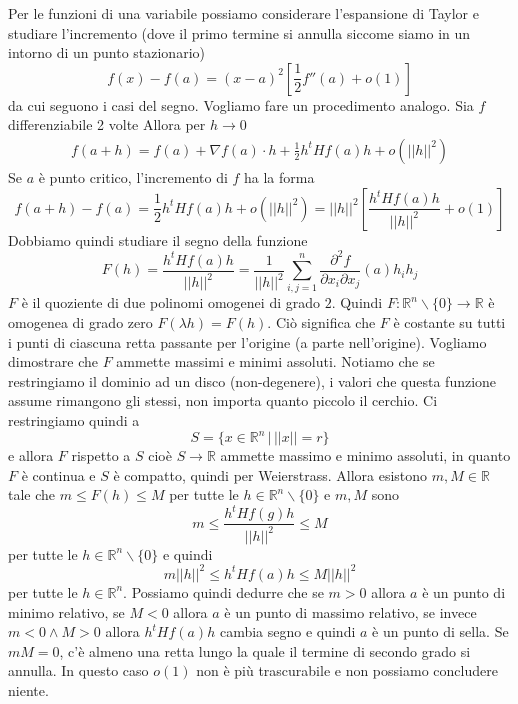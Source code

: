 \documentclass[a4paper]{article}
\begin{document}
Per le funzioni di una variabile possiamo considerare l'espansione di Taylor
e studiare l'incremento (dove il primo termine si annulla siccome siamo in un intorno di un punto stazionario)
\[
    f(x) - f(a) = {(x-a)}^2 \left[
        \frac{1}{2}f''(a) + o(1)
    \right]
\]
da cui seguono i casi del segno.
Vogliamo fare un procedimento analogo.
Sia \(f\) differenziabile 2 volte
Allora per \(h \to 0\)
\begin{align*}
    f(a + h) = f(a) + \nabla f(a) \cdot h + \frac{1}{2}h^t Hf(a)h + o(||h||^2)
\end{align*}
Se \(a\) è punto critico, l'incremento di \(f\) ha la forma
\[
    f(a + h) - f(a) = \frac{1}{2}h^t Hf(a)h + o(||h||^2)
    = ||h||^2 \left[
        \frac{h^tHf(a)h}{||h||^2} + o(1)
    \right]
\]
Dobbiamo quindi studiare il segno della funzione
\[
    F(h) = \frac{h^t Hf(a)h}{||h||^2}
    = \frac{1}{||h||^2} \sum_{i,j = 1}^n \frac{\partial^2 f}{\partial x_i \partial x_j}(a)h_i h_j
\]
\(F\) è il quoziente di due polinomi omogenei di grado \(2\).
Quindi \(F\colon \mathbb{R}^n \backslash \{0\} \to \mathbb{R}\) è omogenea di grado zero \(F(\lambda h) = F(h)\).
Ciò significa che \(F\) è costante su tutti i punti
di ciascuna retta passante per l'origine (a parte nell'origine).
Vogliamo dimostrare che \(F\) ammette massimi e minimi assoluti.
Notiamo che se restringiamo il dominio ad un disco (non-degenere),
i valori che questa funzione assume rimangono gli stessi, non importa quanto piccolo
il cerchio.
Ci restringiamo quindi a \[
    S = \{x \in \mathbb{R}^n \,|\, ||x|| = r\}
\]
e allora \(F\) rispetto a \(S\) cioè \(S \to \mathbb{R}\)
ammette massimo e minimo assoluti,
in quanto \(F\) è continua e \(S\) è compatto,
quindi per Weierstrass.
Allora esistono \(m, M \in \mathbb{R}\)
tale che \(m \leq F(h) \leq M\) per tutte le \(h \in \mathbb{R}^n \backslash \{0\}\)
e \(m, M\) sono
\[
    m \leq \frac{h^t Hf(g)h}{||h||^2} \leq M
\]
per tutte le \(h \in \mathbb{R}^n \backslash \{0\}\)
e quindi
\[
    m||h||^2 \leq h^tHf(a)h \leq M||h||^2
\]
per tutte le \(h \in \mathbb{R}^n\).
Possiamo quindi dedurre che se \(m > 0\) allora \(a\) è un punto
di minimo relativo, se \(M < 0\) allora \(a\) è un punto di massimo relativo,
se invece \(m < 0 \land M > 0\) allora \(h^tHf(a)h\)
cambia segno e quindi \(a\) è un punto di sella.
Se \(mM=0\), c'è almeno una retta lungo la quale il termine di secondo grado si annulla.
In questo caso \(o(1)\) non è più trascurabile e non possiamo concludere niente.
\end{document}
